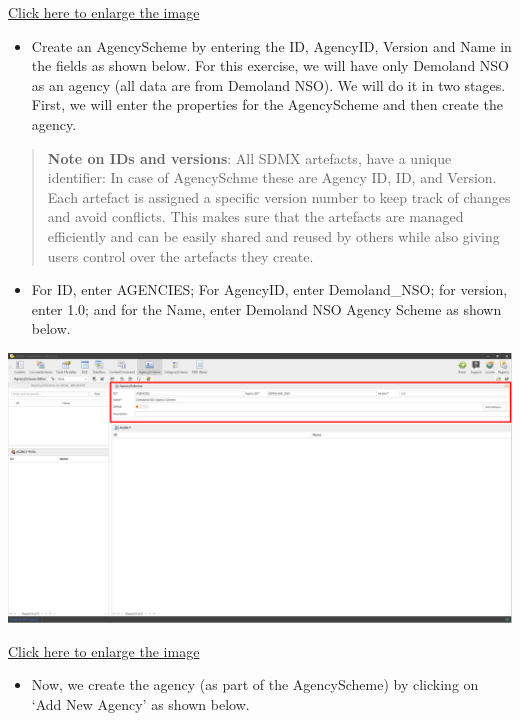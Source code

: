 \documentclass[
]{book}
\providecommand{\tightlist}{%
  \setlength{\itemsep}{0pt}\setlength{\parskip}{0pt}}
\begin{document}
\href{images/image060.png}{Click here to enlarge the image}

\begin{itemize}
\tightlist
\item
  Create an AgencyScheme by entering the ID, AgencyID, Version and Name in the fields as shown below. For this exercise, we will have only Demoland NSO as an agency (all data are from Demoland NSO). We will do it in two stages. First, we will enter the properties for the AgencyScheme and then create the agency.
\end{itemize}

\begin{quote}
\textbf{Note on IDs and versions}: All SDMX artefacts, have a unique identifier: In case of AgencySchme these are Agency ID, ID, and Version. Each artefact is assigned a specific version number to keep track of changes and avoid conflicts. This makes sure that the artefacts are managed efficiently and can be easily shared and reused by others while also giving users control over the artefacts they create.
\end{quote}

\begin{itemize}
\tightlist
\item
  For ID, enter AGENCIES; For AgencyID, enter Demoland\_NSO; for version, enter 1.0; and for the Name, enter Demoland NSO Agency Scheme as shown below.
\end{itemize}

\begin{center}\includegraphics[width=1\linewidth]{./images/image062} \end{center}

\href{images/image062.png}{Click here to enlarge the image}

\begin{itemize}
\tightlist
\item
  Now, we create the agency (as part of the AgencyScheme) by clicking on `Add New Agency' as shown below.
\end{itemize}
\end{document}
